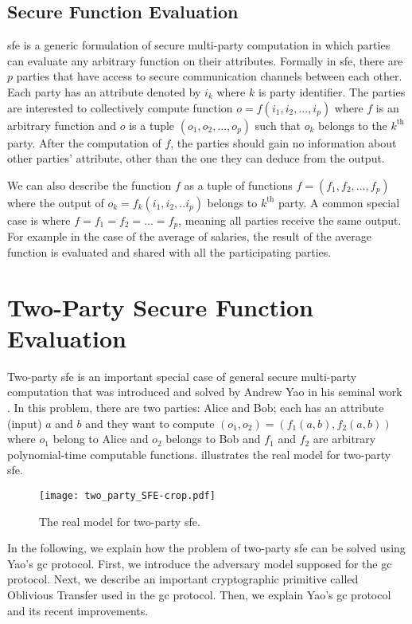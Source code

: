 \subsection{Secure Function Evaluation}\label{ssec:prelim-sfe}
\acrfull{sfe} is a generic formulation of secure multi-party computation in which parties can evaluate any arbitrary function on their attributes.
Formally in \acrshort{sfe}, there are $p$ parties that have access to secure communication channels between each other.
Each party has an attribute denoted by $i_k$ where $k$ is party identifier.
The parties are interested to collectively compute function $o = f(i_1, i_2, ..., i_p)$ where $f$ is an arbitrary function and $o$ is a tuple $(o_1, o_2, ..., o_p)$ such that $o_k$ belongs to the $k^{\text{th}}$ party.
After the computation of $f$, the parties should gain no information about other parties' attribute, other than the one they can deduce from the output.

We can also describe the function $f$ as a tuple of functions $f = (f_1, f_2, ...,  f_p)$ where the output of $o_k = f_k(i_1, i_2, .. i_p)$ belongs to $k^{\text{th}}$ party.
A common special case is where $f = f_1 = f_2 = ... = f_p$, meaning all parties receive the same output.
For example in the case of the average of salaries, the result of the average function is evaluated and shared with all the participating parties.

\section{Two-Party Secure Function Evaluation}\label{sec:prelim-2sfe}
Two-party \acrshort{sfe} is an important special case of general secure multi-party computation that was introduced and solved by Andrew Yao in his seminal work \cite{yao1986generate}.
In this problem, there are two parties: Alice and Bob; each has an attribute (input) $a$ and $b$ and they want to compute $(o_1, o_2) = (f_1(a, b), f_2(a, b))$ where $o_1$ belong to Alice and $o_2$ belongs to Bob and $f_1$ and $f_2$ are arbitrary polynomial-time computable functions.
 illustrates the real model for two-party \acrshort{sfe}.

\begin{figure}
\centering
\texttt{[image: two\_party\_SFE-crop.pdf]}
\caption{The real model for two-party \acrfull{sfe}.}
\label{fig:two-party-sfe}
\end{figure}

In the following, we explain how the problem of two-party \acrshort{sfe} can be solved using Yao's \acrfull{gc} protocol.
First, we introduce the adversary model supposed for the \acrshort{gc} protocol.
Next, we describe an important cryptographic primitive called Oblivious Transfer used in the \acrshort{gc} protocol.
Then, we explain Yao's \acrshort{gc} protocol and its recent improvements.

